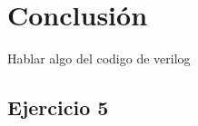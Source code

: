 \documentclass[a4paper]{article}
\begin{document}
\section*{Conclusión}
Hablar algo del codigo de verilog
\subsection*{Ejercicio 5}
\end{document}
